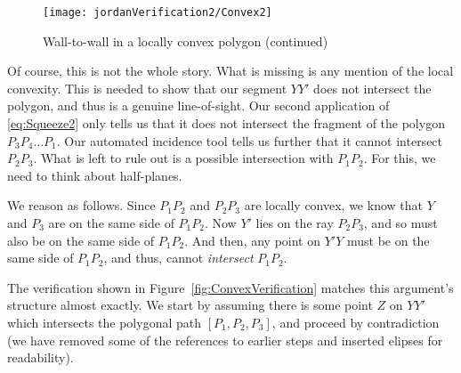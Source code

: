 \begin{figure}
\centering\texttt{[image: jordanVerification2/Convex2]}
\caption{Wall-to-wall in a locally convex polygon (continued)}
\label{fig:Convex2}
\end{figure}

Of course, this is not the whole story. What is missing is any mention of the local convexity. This is needed to show that our segment $YY'$ does not intersect the polygon, and thus is a genuine line-of-sight. Our second application of \eqref{eq:Squeeze2} only tells us that it does not intersect the fragment of the polygon $P_3P_4\ldots P_1$. Our automated incidence tool tells us further that it cannot intersect $P_2P_3$. What is left to rule out is a possible intersection with $P_1P_2$. For this, we need to think about half-planes. 

We reason as follows. Since $P_1P_2$ and $P_2P_3$ are locally convex, we know that $Y$ and $P_3$ are on the same side of $P_1P_2$. Now $Y'$ lies on the ray $P_2P_3$, and so must also be on the same side of $P_1P_2$. And then, any point on $Y'Y$ must be on the same side of $P_1P_2$, and thus, cannot \emph{intersect} $P_1P_2$.

The verification shown in Figure~\ref{fig:ConvexVerification} matches this argument's structure almost exactly.  We start by assuming there is some point $Z$ on $YY'$ which intersects the polygonal path $[P_1,P_2,P_3]$, and proceed by contradiction (we have removed some of the references to earlier steps and inserted elipses for readability). 


